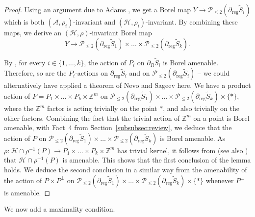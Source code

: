 \documentclass[11pt]{article}
\numberwithin{equation}{section}
\let\mathcal\mathscr
\theoremstyle{plain}
\theoremstyle{definition}
\newcommand{\cala}{\mathcal{A}}
\newcommand{\calh}{\mathcal{H}}
\newcommand{\calp}{\mathcal{P}}
\newcommand{\reg}{\mathrm{reg}}
\begin{document}
\begin{proof}
Using an argument due to Adams \cite[Lem.\,3.2 \&~3.3]{Ada}, we get a Borel map $Y\to \calp_{\le 2}(\partial_\reg \widetilde{S}_i)$ which is both $(\cala,\rho_i)$-invariant and $(\calh,\rho_i)$-invariant. By combining these maps, we derive an $(\calh,\rho)$-invariant Borel map\vspace*{-3pt}
\[
Y\to \calp_{\le 2}(\partial_\reg \widetilde{S}_1)\times\dots\times \calp_{\le 2}(\partial_\reg \widetilde{S}_k).
\]

By \cite[Th.\,5.11]{Duc}, for every $i\in\{1,\dots,k\}$, the action of $P_i$ on $\partial_R \widetilde{S}_i$ is Borel amenable. Therefore, so are the $P_i$-actions on $\partial_\reg \widetilde{S}_i$ and on $\calp_{\le 2}(\partial_\reg\widetilde{S}_i)$ -- we could alternatively have applied a theorem of Nevo and Sageev \cite[Th.\,7.2]{NS} here. We have a product action of $P=P_1\times\dots\times P_k\times \mathbb{Z}^m$ on $\calp_{\le 2}(\partial_\reg \widetilde{S}_1)\times\dots\times \calp_{\le 2}(\partial_\reg \widetilde{S}_k)\times\{*\}$, where the $\mathbb{Z}^m$ factor is acting trivially on the point $\ast$, and also trivially on the other factors. Combining the fact that the trivial action of $\mathbb{Z}^m$ on a point is Borel amenable, with Fact~4 from Section~\ref{subsubsec:review}, we deduce that the action of $P$ on $\calp_{\le 2}(\partial_\reg \widetilde{S}_1)\times\dots\times \calp_{\le 2}(\partial_\reg \widetilde{S}_k)$ is Borel amenable. As $\rho:\calh \cap\rho^{-1}(P)\to P_1\times\dots\times P_k\times\mathbb{Z}^m$ has trivial kernel, it follows from \cite[Prop.\,4.33]{Kid-memoir} (see also \cite[Prop.\,3.38]{GH}) that $\calh \cap\rho^{-1}(P)$ is amenable. This shows that the first conclusion of the lemma holds. We deduce the second conclusion in a similar way from the amenability of the action of $P\times P^\perp$ on $\calp_{\le 2}(\partial_\reg \widetilde{S}_1)\times\dots\times \calp_{\le 2}(\partial_\reg \widetilde{S}_k)\times\{*\}$ whenever $P^\perp$ is amenable.
\end{proof}

We now add a maximality condition.
\end{document}
